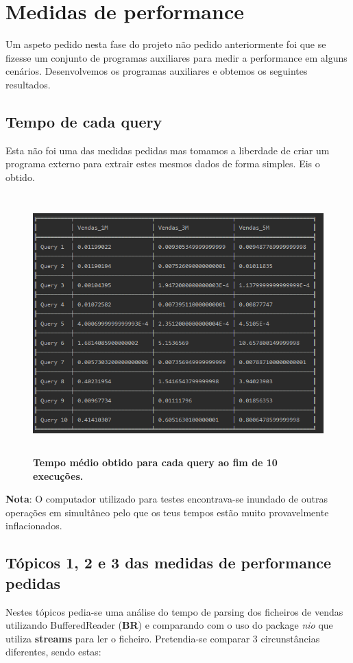 \documentclass[11pt]{article}
\begin{document}
\newpage
\section{Medidas de performance}
Um aspeto pedido nesta fase do projeto não pedido anteriormente foi que se fizesse um conjunto de programas auxiliares para medir a performance em alguns cenários. Desenvolvemos os programas auxiliares e obtemos os seguintes resultados.

\subsection{Tempo de cada query}
Esta não foi uma das medidas pedidas mas tomamos a liberdade de criar um programa externo para extrair estes mesmos dados de forma simples. Eis o obtido.

\begin{figure}[h]
    \centering
    \includegraphics[width=\textwidth,height=10cm]{images/query_times.png}
    \caption{\textbf{Tempo médio obtido para cada query ao fim de 10 execuções.}}
\end{figure}

\textbf{Nota}: O computador utilizado para testes encontrava-se inundado de outras operações em simultâneo pelo que os teus tempos estão muito provavelmente inflacionados.

\subsection{Tópicos 1, 2 e 3 das medidas de performance pedidas}
Nestes tópicos pedia-se uma análise do tempo de parsing dos ficheiros de vendas utilizando BufferedReader (\textbf{BR}) e comparando com o uso do package \textit{nio} que utiliza \textbf{streams} para ler o ficheiro. Pretendia-se comparar 3 circunstâncias diferentes, sendo estas:
\end{document}

